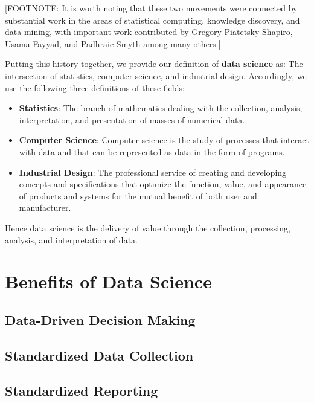 \documentclass[
]{book}
\providecommand{\tightlist}{%
  \setlength{\itemsep}{0pt}\setlength{\parskip}{0pt}}
\begin{document}
{[}FOOTNOTE: It is worth noting that these two movements were connected by substantial work in the areas of statistical computing, knowledge discovery, and data mining, with important work contributed by Gregory Piatetsky-Shapiro, Usama Fayyad, and Padhraic Smyth among many others.{]}

Putting this history together, we provide our definition of \textbf{data science} as: The intersection of statistics, computer science, and industrial design. Accordingly, we use the following three definitions of these fields:

\begin{itemize}
\tightlist
\item
  \textbf{Statistics}: The branch of mathematics dealing with the collection, analysis, interpretation, and presentation of masses of numerical data.
\item
  \textbf{Computer Science}: Computer science is the study of processes that interact with data and that can be represented as data in the form of programs.
\item
  \textbf{Industrial Design}: The professional service of creating and developing concepts and specifications that optimize the function, value, and appearance of products and systems for the mutual benefit of both user and manufacturer.
\end{itemize}

Hence data science is the delivery of value through the collection, processing, analysis, and interpretation of data.

\hypertarget{benefits-of-data-science}{%
\section{Benefits of Data Science}\label{benefits-of-data-science}}

\hypertarget{data-driven-decision-making}{%
\subsection{Data-Driven Decision Making}\label{data-driven-decision-making}}

\hypertarget{standardized-data-collection}{%
\subsection{Standardized Data Collection}\label{standardized-data-collection}}

\hypertarget{standardized-reporting}{%
\subsection{Standardized Reporting}\label{standardized-reporting}}
\end{document}
